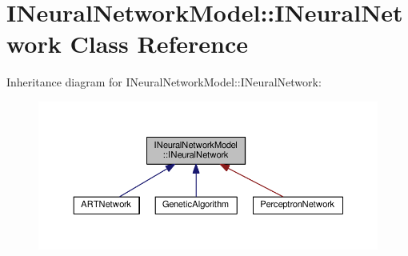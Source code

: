 \hypertarget{class_i_neural_network_model_1_1_i_neural_network}{}\section{I\+Neural\+Network\+Model\+:\+:I\+Neural\+Network Class Reference}
\label{class_i_neural_network_model_1_1_i_neural_network}


Inheritance diagram for I\+Neural\+Network\+Model\+:\+:I\+Neural\+Network\+:\nopagebreak
\begin{figure}[H]
\begin{center}
\leavevmode
\includegraphics[width=350pt]{class_i_neural_network_model_1_1_i_neural_network__inherit__graph}
\end{center}
\end{figure}
